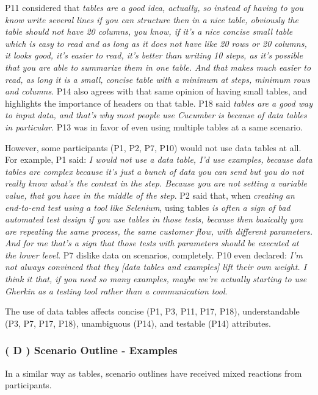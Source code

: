 P11 considered that \textit{tables are a good idea, actually, so instead of having to you know write several lines if you can structure then in a nice table, obviously the table should not have 20 columns, you know, if it's a nice concise small table which is easy to read and as long as it does not have like 20 rows or 20 columns, it looks good, it's easier to read, it's better than writing 10 steps, as it's possible that you are able to summarize them in one table. And that makes much easier to read, as long it is a small, concise table with a minimum at steps, minimum rows and columns}. P14 also agrees with that same opinion of having small tables, and highlights the importance of headers on that table. P18 said \textit{tables are a good way to input data, and that's why most people use Cucumber is because of data tables in particular}. P13 was in favor of even using multiple tables at a same scenario.

However, some participants (P1, P2, P7, P10) would not use data tables at all. For example, P1 said: \textit{I would not use a data table, I'd use examples, because data tables are complex because it's just a bunch of data you can send but you do not really know what's the context in the step. Because you are not setting a variable value, that you have in the middle of the step}. P2 said that, when \textit{creating an end-to-end test using a tool like Selenium}, using tables \textit{is often a sign of bad automated test design if you use tables in those tests, because then basically you are repeating the same process, the same customer flow, with different parameters. And for me that's a sign that those tests with parameters should be executed at the lower level}. P7 dislike data on scenarios, completely. P10 even declared: \textit{I'm not always convinced that they [data tables and examples] lift their own weight. I think it that, if you need so many examples, maybe we're actually starting to use Gherkin as a testing tool rather than a communication tool}.

The use of data tables affects concise (P1, P3, P11, P17, P18), understandable (P3, P7, P17, P18), unambiguous (P14), and testable (P14) attributes.

\subsubsection{\textbf{( D ) Scenario Outline - Examples}}

In a similar way as tables, scenario outlines have received mixed reactions from participants.

